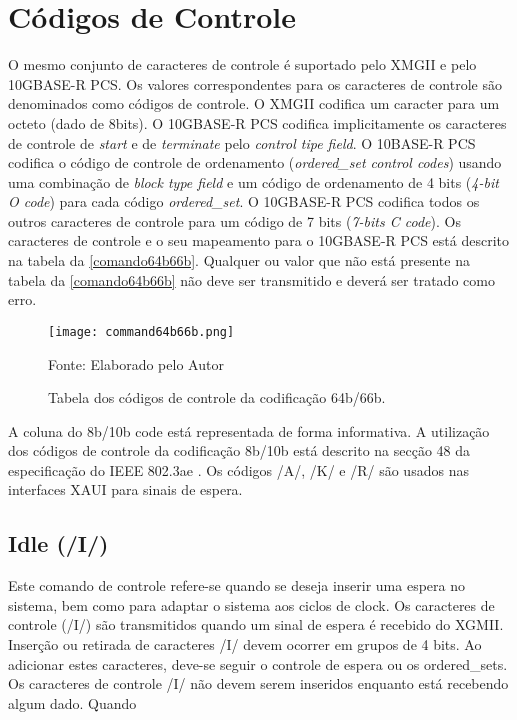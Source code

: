\section{Códigos de Controle}

O mesmo conjunto de caracteres de controle é suportado pelo XMGII e pelo 10GBASE-R PCS. Os valores correspondentes para os caracteres de controle são denominados como códigos de controle. O XMGII codifica um caracter para um octeto (dado de 8bits). O 10GBASE-R PCS codifica implicitamente os caracteres de controle de \textit{start} e de \textit{terminate} pelo \textit{control tipe field}. O 10BASE-R PCS codifica o código de controle de ordenamento (\textit{ordered\_set control codes}) usando uma combinação de \textit{block type field} e um código de ordenamento de 4 bits (\textit{4-bit O code}) para cada código \textit{ordered\_set}. O 10GBASE-R PCS codifica todos os outros caracteres de controle para um código de 7 bits (\textit{7-bits C code}). 
Os caracteres de controle e o seu mapeamento para o 10GBASE-R PCS está descrito na tabela da \autoref{comando64b66b}. Qualquer ou valor que não está presente na tabela da \autoref{comando64b66b} não deve ser transmitido e deverá ser tratado como erro.

\begin{figure}[H]
	\caption{\label{comando64b66b}Tabela dos códigos de controle da codificação 64b/66b.}
	\centering
	\texttt{[image: command64b66b.png]}
	\begin{center}
		Fonte: Elaborado pelo Autor
	\end{center}	
\end{figure}

A coluna do 8b/10b code está representada de forma informativa. A utilização dos códigos de controle da codificação 8b/10b está descrito na secção 48 da especificação do IEEE 802.3ae \cite{IEEstandard}. Os códigos /A/, /K/ e /R/ são usados nas interfaces XAUI para sinais de espera. 

\subsection{Idle (/I/)}

Este comando de controle refere-se quando se deseja inserir uma espera no sistema, bem como para adaptar o sistema aos ciclos de clock. Os caracteres de controle (/I/) são transmitidos quando um sinal de espera é recebido do XGMII. Inserção ou retirada de caracteres /I/ devem ocorrer em grupos de 4 bits. Ao adicionar estes caracteres, deve-se seguir o controle de espera ou os ordered\_sets. Os caracteres de controle /I/ não devem serem inseridos enquanto está recebendo algum dado. Quando 


